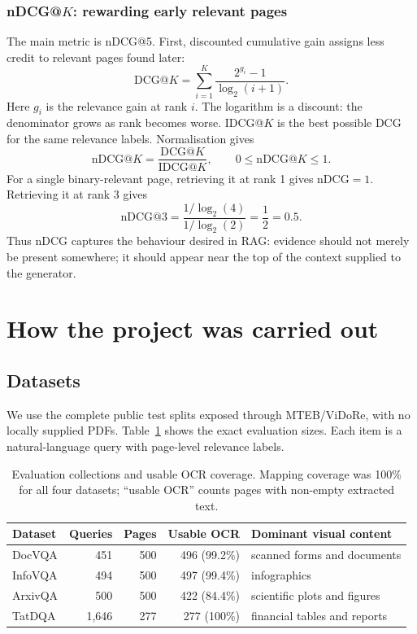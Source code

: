 \documentclass[11pt,a4paper]{article}
\begin{document}
\subsubsection*{nDCG@$K$: rewarding early relevant pages}

The main metric is nDCG@5. First, discounted cumulative gain assigns less credit to relevant pages found later:
\begin{equation}
\mathrm{DCG}@K=\sum_{i=1}^{K}\frac{2^{g_i}-1}{\log_2(i+1)}.
\label{eq:dcg}
\end{equation}
Here $g_i$ is the relevance gain at rank $i$. The logarithm is a discount: the denominator grows as rank becomes worse. IDCG@$K$ is the best possible DCG for the same relevance labels. Normalisation gives
\begin{equation}
\mathrm{nDCG}@K=\frac{\mathrm{DCG}@K}{\mathrm{IDCG}@K},
\qquad 0\le\mathrm{nDCG}@K\le1.
\end{equation}
For a single binary-relevant page, retrieving it at rank 1 gives nDCG$=1$. Retrieving it at rank 3 gives
\begin{equation}
\mathrm{nDCG}@3=\frac{1/\log_2(4)}{1/\log_2(2)}=\frac{1}{2}=0.5.
\end{equation}
Thus nDCG captures the behaviour desired in RAG: evidence should not merely be present somewhere; it should appear near the top of the context supplied to the generator.

\section{How the project was carried out}

\subsection{Datasets}

We use the complete public test splits exposed through MTEB/ViDoRe, with no locally supplied PDFs. Table~\ref{tab:data} shows the exact evaluation sizes. Each item is a natural-language query with page-level relevance labels.

\begin{table}[H]
\centering
\caption{Evaluation collections and usable OCR coverage. Mapping coverage was 100\% for all four datasets; ``usable OCR'' counts pages with non-empty extracted text.}
\label{tab:data}
\begin{tabular}{lrrrl}
\toprule
Dataset & Queries & Pages & Usable OCR & Dominant visual content \\
\midrule
DocVQA & 451 & 500 & 496 (99.2\%) & scanned forms and documents \\
InfoVQA & 494 & 500 & 497 (99.4\%) & infographics \\
ArxivQA & 500 & 500 & 422 (84.4\%) & scientific plots and figures \\
TatDQA & 1,646 & 277 & 277 (100\%) & financial tables and reports \\
\bottomrule
\end{tabular}
\end{table}
\end{document}
